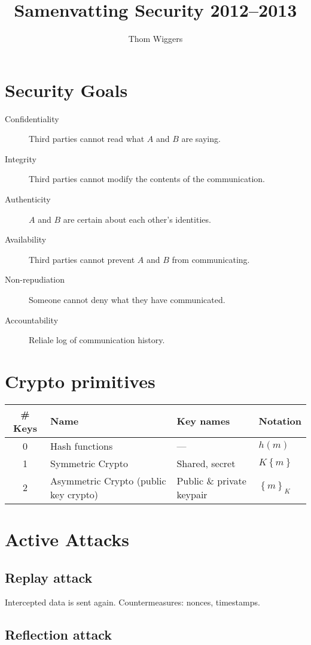 \documentclass{article}
\author{Thom Wiggers}
\title{Samenvatting Security 2012--2013}
\begin{document}
\section{Security Goals}


\begin{description}
  \item[Confidentiality] Third parties cannot read what $A$ and $B$ are saying.
  \item[Integrity] Third parties cannot modify the contents of the communication.
  \item[Authenticity] $A$ and $B$ are certain about each other's identities.
  \item[Availability] Third parties cannot prevent $A$ and $B$ from communicating.
  \item[Non-repudiation] Someone cannot deny what they have communicated.
  \item[Accountability] Reliale log of communication history.
\end{description}

\section{Crypto primitives}

\begin{tabular}[h]{c||p{100pt}|l|l}
  \bf \# Keys & \bf Name & \bf Key names & \bf Notation \\ \hline \hline
  0 & Hash functions & --- & $h(m)$ \\ \hline
  1 & Symmetric Crypto & Shared, secret & $K\left\{ m \right\}$  \\\hline
  2 & Asymmetric Crypto (public key crypto) & Public \& private keypair & $\left\{ m \right\}_K$ \\
\end{tabular}

\section{Active Attacks}

\subsection{Replay attack}

Intercepted data is sent again. Countermeasures: nonces, timestamps.

\subsection{Reflection attack}
\end{document}
